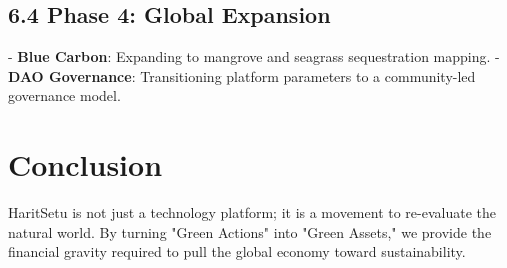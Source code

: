 \documentclass[11pt,a4paper]{article}
\begin{document}
\subsection{6.4 Phase 4: Global Expansion}
- \textbf{Blue Carbon}: Expanding to mangrove and seagrass sequestration mapping.
- \textbf{DAO Governance}: Transitioning platform parameters to a community-led governance model.

\section{Conclusion}
HaritSetu is not just a technology platform; it is a movement to re-evaluate the natural world. By turning "Green Actions" into "Green Assets," we provide the financial gravity required to pull the global economy toward sustainability. 
\end{document}
